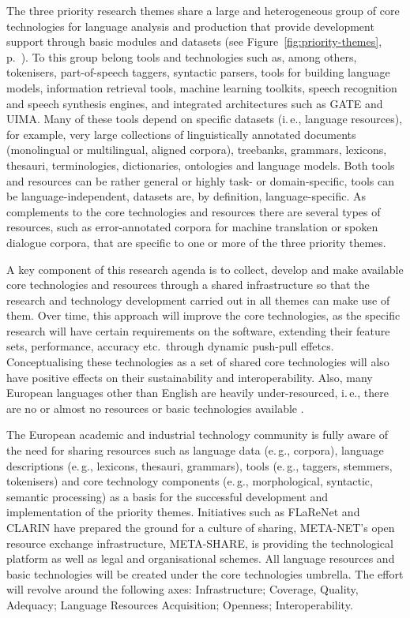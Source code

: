 \documentclass[10pt, plain]{../../metanetpaper}
\begin{document}
\begin{multicols}{2}
The three priority research themes share a large and heterogeneous group of core technologies for language analysis and production that provide development support through basic modules and datasets (see Figure~\ref{fig:priority-themes}, p.~\pageref{fig:priority-themes}). To this group belong tools and technologies such as, among others, tokenisers, part-of-speech taggers, syntactic parsers, tools for building language models, information retrieval tools, machine learning toolkits, speech recognition and speech synthesis engines, and integrated architectures such as GATE and UIMA. Many of these tools depend on specific datasets (i.\,e., language resources), for example, very large collections of linguistically annotated documents (monolingual or multilingual, aligned corpora), treebanks, grammars, lexicons, thesauri, terminologies, dictionaries, ontologies and language models. Both tools and resources can be rather general or highly task- or domain-specific, tools can be language-independent, datasets are, by definition, language-specific. As complements to the core technologies and resources there are several types of resources, such as error-annotated corpora for machine translation or spoken dialogue corpora, that are specific to one or more of the three priority themes.

A key component of this research agenda is to collect, develop and make available core technologies and resources through a shared infrastructure so that the research and technology development carried out in all themes can make use of them. Over time, this approach will improve the core technologies, as the specific research will have certain requirements on the software, extending their feature sets, performance, accuracy etc.~through dynamic push-pull effetcs. Conceptualising these technologies as a set of shared core technologies will also have positive effects on their sustainability and interoperability. Also, many European languages other than English are heavily under-resourced, i.\,e., there are no or almost no resources or basic technologies available \cite{LWP2012}.

The European academic and industrial technology community is fully aware of the need for sharing resources such as language data (e.\,g., corpora), language descriptions (e.\,g., lexicons, thesauri, grammars), tools (e.\,g., taggers, stemmers, tokenisers) and core technology components (e.\,g., morphological, syntactic, semantic processing) as a basis for the successful development and implementation of the priority themes. Initiatives such as FLaReNet \cite{flarenetsra2011} and CLARIN have prepared the ground for a culture of sharing, META-NET's open resource exchange infrastructure, META-SHARE, is providing the technological platform as well as legal and organisational schemes. All language resources and basic technologies will be created under the core technologies umbrella. The effort will revolve around the following axes: Infrastructure; Coverage, Quality, Adequacy; Language Resources Acquisition; Openness; Interoperability.


\end{multicols}
\end{document}
